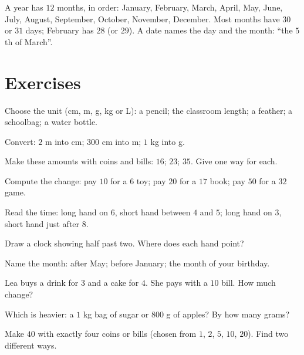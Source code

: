 \begin{example}\label{ex:g2:measure:calendar}
A year has $12$ months, in order: January, February, March, April,
May, June, July, August, September, October, November, December.
Most months have $30$ or $31$ days; February has $28$ (or $29$).
A date names the day and the month: ``the $5$th of March''.
\end{example}

\section{Exercises}

\begin{exercise}[$\star$]\label{exo:g2:measure:1}
Choose the unit (cm, m, g, kg or L): a pencil; the classroom
length; a feather; a schoolbag; a water bottle.
\end{exercise}

\begin{exercise}[$\star$]\label{exo:g2:measure:2}
Convert: $2$ m into cm; $300$ cm into m; $1$ kg into g.
\end{exercise}

\begin{exercise}[$\star$]\label{exo:g2:measure:3}
Make these amounts with coins and bills: $16$; \quad $23$; \quad
$35$. Give one way for each.
\end{exercise}

\begin{exercise}[$\star$]\label{exo:g2:measure:4}
Compute the change: pay $10$ for a $6$ toy; pay $20$ for a $17$
book; pay $50$ for a $32$ game.
\end{exercise}

\begin{exercise}[$\star$]\label{exo:g2:measure:5}
Read the time: long hand on $6$, short hand between $4$ and $5$;
long hand on $3$, short hand just after $8$.
\end{exercise}

\begin{exercise}[$\star$]\label{exo:g2:measure:6}
Draw a clock showing half past two. Where does each hand point?
\end{exercise}

\begin{exercise}[$\star$]\label{exo:g2:measure:7}
Name the month: after May; before January; the month of your
birthday.
\end{exercise}

\begin{exercise}[$\star$]\label{exo:g2:measure:8}
Lea buys a drink for $3$ and a cake for $4$. She pays with a $10$
bill. How much change?
\end{exercise}

\begin{exercise}[$\star$]\label{exo:g2:measure:9}
Which is heavier: a $1$ kg bag of sugar or $800$ g of apples? By how
many grams?
\end{exercise}

\begin{exercise}[$\star\star$]\label{exo:g2:measure:10}
Make $40$ with exactly four coins or bills (chosen from $1$, $2$,
$5$, $10$, $20$). Find two different ways.
\end{exercise}
